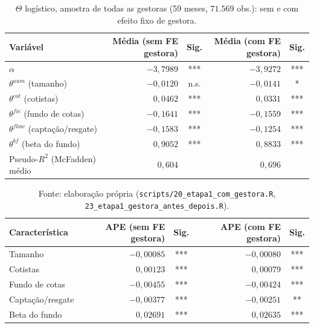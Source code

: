 \documentclass[11pt,a4paper]{article}
\begin{document}
\begin{table}[h]\centering\small
\caption{$\Theta$ logístico, amostra de todas as gestoras (59 meses, $71.569$ obs.): sem e com
efeito fixo de gestora.}
\begin{tabular}{@{}lrcrc@{}}
\toprule
Variável & Média (sem FE gestora) & Sig. & Média (com FE gestora) & Sig. \\
\midrule
$\alpha$                   & $-3{,}7989$  & *** & $-3{,}9272$  & *** \\
$\theta^{aum}$ (tamanho)        & $-0{,}0120$ & n.s. & $-0{,}0141$ & * \\
$\theta^{cot}$ (cotistas)       & $0{,}0462$  & *** & $0{,}0331$  & *** \\
$\theta^{fic}$ (fundo de cotas) & $-0{,}1641$ & *** & $-0{,}1559$ & *** \\
$\theta^{flow}$ (captação/resgate) & $-0{,}1583$ & *** & $-0{,}1254$ & *** \\
$\theta^{bf}$ (beta do fundo)   & $0{,}9052$  & *** & $0{,}8833$  & *** \\
\midrule
Pseudo-$R^2$ (McFadden) médio & $0{,}604$ & & $0{,}696$ & \\
\bottomrule
\end{tabular}
\end{table}

\begin{table}[h]\centering\small
\caption{Efeito marginal médio (APE) do logit com todas as gestoras, em pontos percentuais.}
\begin{tabular}{@{}lrcrc@{}}
\toprule
Característica & APE (sem FE gestora) & Sig. & APE (com FE gestora) & Sig. \\
\midrule
Tamanho              & $-0{,}00085$ & *** & $-0{,}00080$ & *** \\
Cotistas             & $0{,}00123$  & *** & $0{,}00079$  & *** \\
Fundo de cotas       & $-0{,}00455$ & *** & $-0{,}00424$ & *** \\
Captação/resgate     & $-0{,}00377$ & *** & $-0{,}00251$ & ** \\
Beta do fundo        & $0{,}02691$  & *** & $0{,}02635$  & *** \\
\bottomrule
\end{tabular}
\caption*{\footnotesize Fonte: elaboração própria (\texttt{scripts/20\_etapa1\_com\_gestora.R},
\texttt{23\_etapa1\_gestora\_antes\_depois.R}).}
\end{table}
\end{document}
